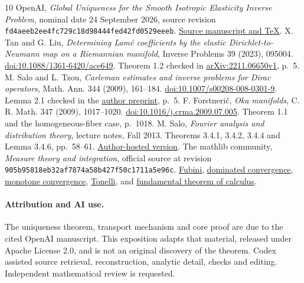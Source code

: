 \documentclass[11pt]{article}
\theoremstyle{remark}
\numberwithin{equation}{section}
\begin{document}
\begingroup
\small
\raggedright
\begin{thebibliography}{10}
 OpenAI, \emph{Global Uniqueness for the Smooth Isotropic
Elasticity Inverse Problem}, nominal date 24 September 2026, source revision
\texttt{fd4aeeb2ee4fc729c18d98444fed42fd0529eeeb}.
\href{https://github.com/openai/math/tree/fd4aeeb2ee4fc729c18d98444fed42fd0529eeeb/preprints/Global-Uniqueness-for-the-Smooth-Isotropic-Elasticity-Inverse-Problem-September-24-2026}{Source manuscript and TeX}.
 X. Tan and G. Liu, \emph{Determining Lam\'e coefficients
by the elastic Dirichlet-to-Neumann map on a Riemannian manifold}, Inverse
Problems 39 (2023), 095004. \href{https://doi.org/10.1088/1361-6420/ace649}{doi:10.1088/1361-6420/ace649}.
Theorem 1.2 checked in \href{https://arxiv.org/pdf/2211.06650v1}{arXiv:2211.06650v1}, p.~5.
 M. Salo and L. Tzou, \emph{Carleman estimates and
inverse problems for Dirac operators}, Math. Ann. 344 (2009), 161--184.
\href{https://doi.org/10.1007/s00208-008-0301-9}{doi:10.1007/s00208-008-0301-9}.
Lemma 2.1 checked in the \href{https://users.jyu.fi/~salomi/pub/carleman_dirac_ip.pdf}{author preprint}, p.~5.
 F. Forstneri\v c, \emph{Oka manifolds}, C. R. Math.
347 (2009), 1017--1020. \href{https://doi.org/10.1016/j.crma.2009.07.005}{doi:10.1016/j.crma.2009.07.005}.
Theorem 1.1 and the homogeneous-fiber case, p.~1018.
 M. Salo, \emph{Fourier analysis and distribution
theory}, lecture notes, Fall 2013. Theorems 3.4.1, 3.4.2, 3.4.4 and Lemma
3.4.6, pp.~58--61. \href{https://users.jyu.fi/~salomi/teaching/fa_2024/FA_distributions.pdf}{Author-hosted version}.
 The mathlib community, \emph{Measure theory
and integration}, official source at revision
\texttt{905b95818eb32af7874a58b427f50c1711a5e96c}.
\href{https://github.com/leanprover-community/mathlib4/blob/905b95818eb32af7874a58b427f50c1711a5e96c/Mathlib/MeasureTheory/Integral/Prod.lean}{Fubini},
\href{https://github.com/leanprover-community/mathlib4/blob/905b95818eb32af7874a58b427f50c1711a5e96c/Mathlib/MeasureTheory/Integral/DominatedConvergence.lean}{dominated convergence},
\href{https://github.com/leanprover-community/mathlib4/blob/905b95818eb32af7874a58b427f50c1711a5e96c/Mathlib/MeasureTheory/Integral/Lebesgue/Add.lean}{monotone convergence},
\href{https://github.com/leanprover-community/mathlib4/blob/905b95818eb32af7874a58b427f50c1711a5e96c/Mathlib/MeasureTheory/Measure/Prod.lean}{Tonelli}, and
\href{https://github.com/leanprover-community/mathlib4/blob/905b95818eb32af7874a58b427f50c1711a5e96c/Mathlib/MeasureTheory/Integral/IntervalIntegral/FundThmCalculus.lean}{fundamental theorem of calculus}.
\end{thebibliography}
\endgroup
\paragraph{Attribution and AI use.}
The uniqueness theorem, transport mechanism and core proof are due to the
cited OpenAI manuscript. This exposition adapts that material, released
under Apache License 2.0, and is not an original discovery of the theorem.
Codex assisted source retrieval, reconstruction, analytic detail, checks and
editing. Independent mathematical review is requested.
\end{document}
